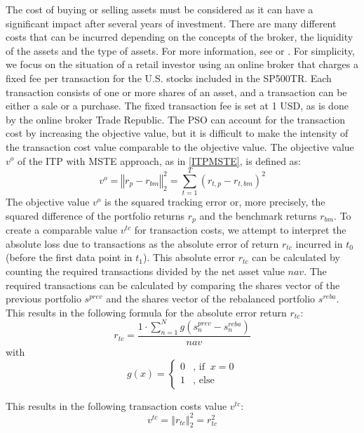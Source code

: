 \documentclass[
  oneside]{book}
\begin{document}
The cost of buying or selling assets must be considered as it can have a significant impact after several years of investment. There are many different costs that can be incurred depending on the concepts of the broker, the liquidity of the assets and the type of assets. For more information, see \citep{AkGa2022} or \citep{NySe2022}. For simplicity, we focus on the situation of a retail investor using an online broker that charges a fixed fee per transaction for the U.S. stocks included in the SP500TR. Each transaction consists of one or more shares of an asset, and a transaction can be either a sale or a purchase. The fixed transaction fee is set at 1 USD, as is done by the online broker Trade Republic. The PSO can account for the transaction cost by increasing the objective value, but it is difficult to make the intensity of the transaction cost value comparable to the objective value. The objective value \(v^o\) of the ITP with MSTE approach, as in \ref{ITPMSTE}, is defined as:
\[
 v^o = \left\Vert r_{p}-r_{bm} \right\Vert_2^2 = \sum_{t=1}^T (r_{t,p}-r_{t,bm})^2
\]
The objective value \(v^o\) is the squared tracking error or, more precisely, the squared difference of the portfolio returns \(r_p\) and the benchmark returns \(r_{bm}\). To create a comparable value \(v^{tc}\) for transaction costs, we attempt to interpret the absolute loss due to transactions as the absolute error of return \(r_{tc}\) incurred in \(t_0\) (before the first data point in \(t_1\)). This absolute error \(r_{tc}\) can be calculated by counting the required transactions divided by the net asset value \(nav\). The required transactions can be calculated by comparing the shares vector of the previous portfolio \(s^{prev}\) and the shares vector of the rebalanced portfolio \(s^{reba}\). This results in the following formula for the absolute error return \(r_{tc}\):
\[
 r_{tc} = \frac{1 \cdot \sum_{n=1}^N g(s^{prev}_n-s^{reba}_n) }{nav}
\]
with
\[
  g(x) =    \begin{cases}
  0 &\text{, if }\ x = 0\\
  1 &\text{, else}
  \end{cases}
\]

This results in the following transaction costs value \(v^{tc}\):
\[
v^{tc} = \left\Vert r_{tc} \right\Vert_2^2 = r_{tc}^2
\]
\end{document}
